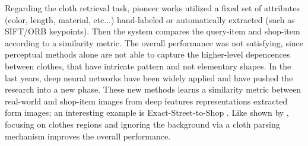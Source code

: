 Regarding the cloth retrieval task, pioneer works utilized a fixed set of attributes (color, length, material, etc...) hand-labeled or automatically extracted (such as SIFT/ORB keypoints). Then the system compares the query-item and shop-item according to a similarity metric. The overall performance was not satisfying, since perceptual methods alone are not able to capture the higher-level depencences between clothes, that have intricate pattern and not elementary shapes. In the last years, deep neural networks have been widely applied and have pushed the research into a new phase. These new methods learns a similarity metric between real-world and shop-item images from deep features representations extracted form images; an interesting example is Exact-Street-to-Shop \cite{stree2shop}. Like shown by \cite{wang2017clothing}, focusing on clothes regions and ignoring the background via a cloth parsing mechanism improves the overall performance.

\hfill






